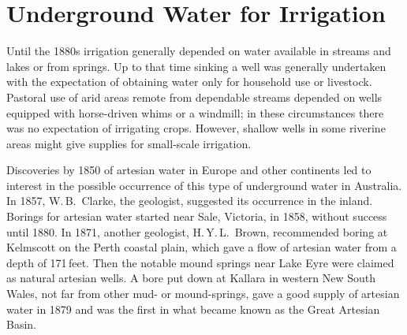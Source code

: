 
\setcounter{endnote}{0}

\chapter{Underground Water for Irrigation}
\label{ch:underground}


Until the 1880s irrigation generally depended on water available in
streams and lakes or from springs.  Up to that time sinking a well was
generally undertaken with the expectation of obtaining water only for
household use or livestock.  Pastoral use of arid areas remote from
dependable streams depended on wells equipped with horse-driven whims
or a windmill; in these circumstances there was no expectation of
irrigating crops.  However, shallow wells in some riverine areas might
give supplies for small-scale irrigation.

Discoveries by 1850 of artesian water  in Europe
and other continents led to interest in the possible occurrence of
this type of underground water in Australia.  In 1857, W.\,B.~Clarke,
  the geologist, suggested its occurrence in the
inland. Borings for artesian water started near Sale,  Victoria, in 1858, without success until 1880.  In 1871, another
geologist, H.\,Y.\,L.~Brown,  recommended
boring at Kelmscott  on the Perth coastal plain,
which gave a flow of artesian water from a depth of 171\,feet.  Then
the notable mound springs  near Lake Eyre
 were claimed as natural artesian wells. A bore put
down at Kallara
 in western New South Wales, not far from other
mud- or mound-springs, gave a good supply of artesian water in 1879
and was the first in what became known as the Great Artesian
 Basin.

